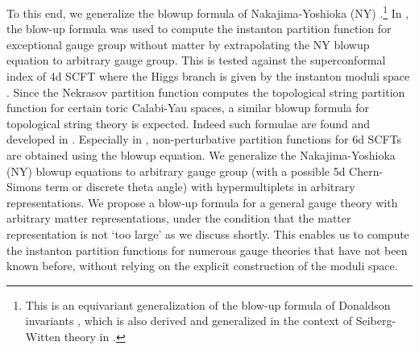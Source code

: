 \documentclass[letterpaper, 11pt]{article}
\begin{document}
To this end, we generalize the blowup formula of Nakajima-Yoshioka (NY) \cite{Nakajima:2003pg,Nakajima:2003uh,Nakajima:2005fg, Gottsche:2006bm, Nakajima:2009qjc, Gottsche:2010ig}.\footnote{This is an equivariant generalization of the blow-up formula of Donaldson invariants \cite{FintushelStern}, which is also derived and generalized in the context of Seiberg-Witten theory in \cite{Moore:1997pc, Marino:1998bm}.}
 In \cite{Keller:2012da}, the blow-up formula was used to compute the instanton partition function for exceptional gauge group without matter by extrapolating the NY blowup equation to arbitrary gauge group. This is tested against the superconformal index of 4d SCFT where the Higgs branch is given by the instanton moduli space \cite{Gaiotto:2012uq}. Since the Nekrasov partition function computes the topological string partition function for certain toric Calabi-Yau spaces, a similar blowup formula for topological string theory is expected. Indeed such formulae are found and developed in \cite{Grassi:2016nnt, Gu:2017ccq, Huang:2017mis, Gu:2018gmy,Gu:2019dan}. Especially in \cite{Gu:2018gmy,Gu:2019dan}, non-perturbative partition functions for 6d SCFTs are obtained using the blowup equation. 
We generalize the Nakajima-Yoshioka (NY) blowup equations \cite{Nakajima:2003pg,Nakajima:2003uh,Nakajima:2005fg, Gottsche:2006bm, Nakajima:2009qjc, Gottsche:2010ig} to arbitrary gauge group (with a possible 5d Chern-Simons term or discrete theta angle) with hypermultiplets in arbitrary representations. We propose a blow-up formula for a general gauge theory with arbitrary matter representations, under the condition that the matter representation is not `too large' as we discuss shortly. This enables us to compute the instanton partition functions for numerous gauge theories that have not been known before, without relying on the explicit construction of the moduli space. 
\end{document}
